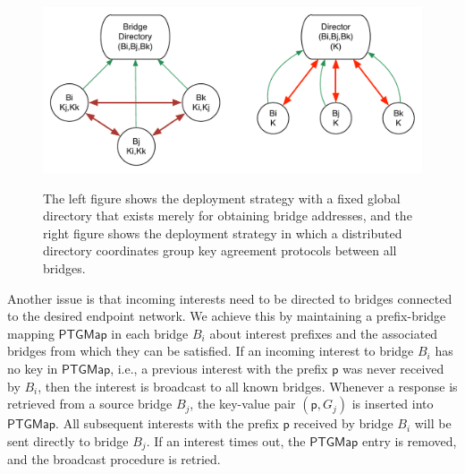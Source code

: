 \begin{figure}[ht!]
\begin{center}
\includegraphics[scale=0.6]{./images/gateway_group.pdf}
\label{fig:gateway-groups}
\caption{The left figure shows the deployment strategy with a fixed global directory that exists merely for obtaining bridge addresses, and the right figure shows the deployment strategy in which a distributed directory coordinates group key agreement protocols between all bridges.}
\end{center}
\end{figure}

Another issue is that incoming interests need to be directed to bridges connected to the desired endpoint network. We achieve this by maintaining a prefix-bridge mapping $\mathsf{PTGMap}$ in each bridge $B_i$ about interest prefixes and the associated bridges from which they can be satisfied. If an incoming interest to bridge $B_i$ has no key in $\mathsf{PTGMap}$, i.e., a previous interest with the prefix $\mathsf{p}$ was never received by $B_i$, then the interest is broadcast to all known bridges. Whenever a response is retrieved from a source bridge $B_j$, the key-value pair $(\mathsf{p}, G_j)$ is inserted into $\mathsf{PTGMap}$. All subsequent interests with the prefix $\mathsf{p}$ received by bridge $B_i$ will be sent directly to bridge $B_j$. If an interest times out, the $\mathsf{PTGMap}$ entry is removed, and the broadcast procedure is retried. 

    


